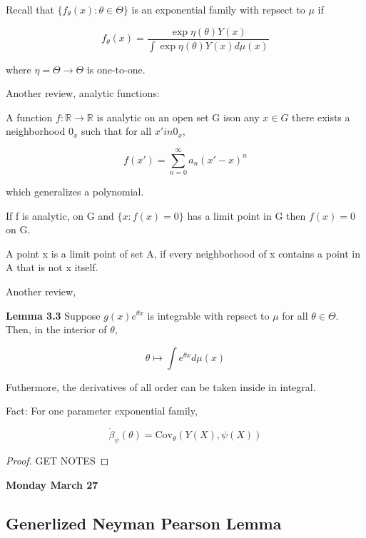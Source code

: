 \documentclass[11pt,fleqn]{book} %
\newcommand{\Cov}{\mathrm{Cov}}
\begin{document}
	Recall that $\{f_\theta (x): \theta \in \Theta \}$ is an exponential family with repsect to $\mu$ if 

			$$f_\theta(x) = \frac{\exp{\eta(\theta) Y(x)}}{\int \exp{\eta(\theta) Y(x) d\mu(x)}} $$

	where $\eta = \Theta \rightarrow \Theta$ is one-to-one. 

	Another review, analytic functions:

	\begin{definition}
		A function $f: \mathbb{R} \rightarrow \mathbb{R}$ is analytic on an open set G ison any $x \in G$ there exists a neighborhood $0_x$ such that for all $x' in 0_x$, 

				$$f(x') = \sum^\infty_{n = 0} a_n (x' - x)^n $$

		which generalizes a polynomial. 
	\end{definition}

\begin{theorem}
	If f is analytic, on G and $\{x: f(x) = 0 \}$ has a limit point in G then $f(x) = 0$ on G. 
\end{theorem}

\begin{definition}
	A point x is a limit point of set A, if every neighborhood of x contains a point in A that is not x itself. 
\end{definition}

Another review, 

\textbf{Lemma 3.3} Suppose $g(x) e^{\theta x}$ is integrable with repsect to $\mu$ for all $\theta \in \Theta$. Then, in the interior of $\theta$, 

		$$\theta \mapsto \int e^{\theta x} d\mu(x) $$

Futhermore, the derivatives of all order can be taken inside in integral. 


Fact: For one parameter exponential family, 

		$$\dot{\beta}_\psi (\theta) = \Cov_\theta (Y(X), \psi(X)) $$

\begin{proof}
 	
GET NOTES 

 \end{proof} 
 
\textbf{Monday March 27}\\

\subsection{Generlized Neyman Pearson Lemma}
\end{document}
